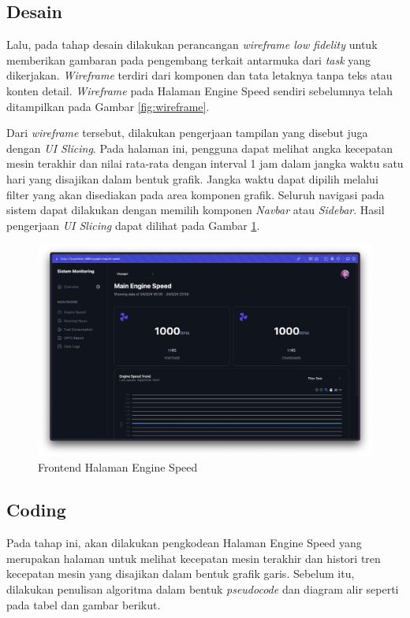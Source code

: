 \subsection{Desain}

Lalu, pada tahap desain dilakukan perancangan \textit{wireframe low fidelity} untuk memberikan gambaran pada pengembang terkait antarmuka dari \textit{task} yang dikerjakan. \textit{Wireframe} terdiri dari komponen dan tata letaknya tanpa teks atau konten detail. \textit{Wireframe} pada Halaman Engine Speed sendiri sebelumnya telah ditampilkan pada Gambar \ref{fig:wireframe}.

Dari \textit{wireframe} tersebut, dilakukan pengerjaan tampilan yang disebut juga dengan \textit{UI Slicing}. Pada halaman ini, pengguna dapat melihat angka kecepatan mesin terakhir dan nilai rata-rata dengan interval 1 jam dalam jangka waktu satu hari yang disajikan dalam bentuk grafik. Jangka waktu dapat dipilih melalui filter yang akan disediakan pada area komponen grafik. Seluruh navigasi pada sistem dapat dilakukan dengan memilih komponen \textit{Navbar} atau \textit{Sidebar}. Hasil pengerjaan \textit{UI Slicing} dapat dilihat pada Gambar \ref{fig:fe-es}.

\begin{figure}[!h]
    \includegraphics[width=1.1\linewidth, center]{images/hasil/iterations/1/fe-es.png}
    \caption{Frontend Halaman Engine Speed}
    \label{fig:fe-es}
\end{figure}

\subsection{Coding}

Pada tahap ini, akan dilakukan pengkodean Halaman Engine Speed yang merupakan halaman untuk melihat kecepatan mesin terakhir dan histori tren kecepatan mesin yang disajikan dalam bentuk grafik garis. Sebelum itu, dilakukan penulisan algoritma dalam bentuk \textit{pseudocode} dan diagram alir seperti pada tabel dan gambar berikut.

